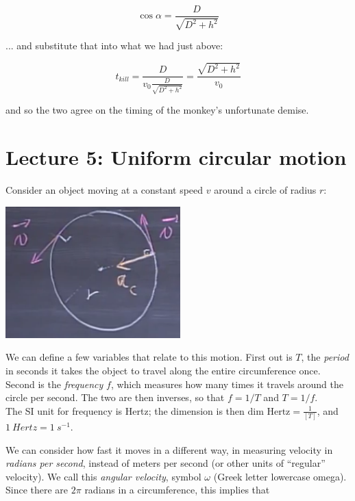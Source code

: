 \documentclass[12pt,a4paper]{report}
\begin{document}
\begin{equation}
\cos \alpha = \frac{D}{\sqrt{D^2 + h^2}}
\end{equation}

... and substitute that into what we had just above:

\begin{equation}
t_{kill} = \frac{D}{v_0 \frac{D}{\sqrt{D^2 + h^2}}} = \frac{\sqrt{D^2 + h^2}}{v_0} 
\end{equation}

and so the two agree on the timing of the monkey's unfortunate demise.

\newpage

\section{Lecture 5: Uniform circular motion}

Consider an object moving at a constant speed $v$ around a circle of radius $r$:

\begin{center}
\includegraphics[scale=0.6]{Graphics/lec5_centripetal_acceleration}
\end{center}

We can define a few variables that relate to this motion. First out is $T$, the \emph{period} in seconds it takes the object to travel along the entire circumference once. Second is the \emph{frequency} $f$, which measures how many times it travels around the circle per second. The two are then inverses, so that $f = 1/T$ and $T = 1/f$.\\
The SI unit for frequency is Hertz; the dimension is then $\text{dim Hertz} = \displaystyle \frac{1}{[T]}$, and $\SI{1}{Hertz} = \SI{1}{s^{-1}}$.

We can consider how fast it moves in a different way, in measuring velocity in \emph{radians per second}, instead of meters per second (or other units of ``regular'' velocity). We call this \emph{angular velocity}, symbol $\omega$ (Greek letter lowercase omega). Since there are $2\pi$ radians in a circumference, this implies that
\end{document}
